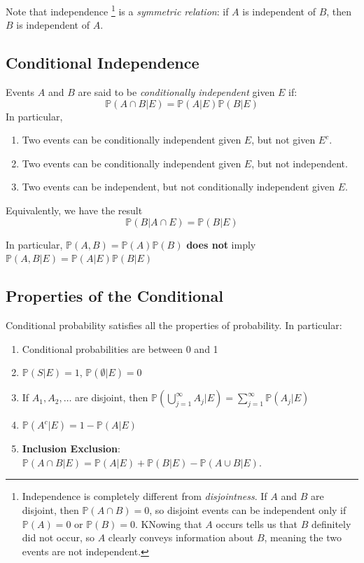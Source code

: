 \documentclass{article}
\begin{document}
Note that independence \footnote{Independence is completely different from \textit{disjointness}. If $A$ and $B$ are disjoint, then $ \mathbb{P}(A \cap B) = 0$, so disjoint events can be independent only if $ \mathbb{P}(A) = 0$ or $ \mathbb{P}(B) = 0$. KNowing that $A$ occurs tells us that $B$ definitely did not occur, so $A$ clearly conveys information about $B$, meaning the two events are not independent.} is a \textit{symmetric relation}: if $A$ is independent of $B$, then $B$ is independent of $A$.

\subsection{Conditional Independence}

\begin{definition}
    Events $A$ and $B$ are said to be \textit{conditionally independent} given $E$ if: \begin{equation}
        \mathbb{P}(A \cap B | E) = \mathbb{P} (A | E) \mathbb{P} (B | E)
    \end{equation} In particular, \begin{enumerate}
        \item Two events can be conditionally independent given $E$, but not given $E^{c}$.
        \item Two events can be conditionally independent given $E$, but not independent. 
        \item Two events can be independent, but not conditionally independent given $E$. 
    \end{enumerate}  
    \noindent Equivalently, we have the result \begin{equation}
        \mathbb{P}(B | A \cap E) = \mathbb{P}(B | E)
    \end{equation}
\end{definition} In particular, $ \mathbb{P}(A, B) = \mathbb{P}(A) \mathbb{P}(B)$ \textbf{does not} imply $ \mathbb{P}(A, B | E) = \mathbb{P} (A |E ) \mathbb{P}(B|E)$

\subsection{Properties of the Conditional}

Conditional probability satisfies all the properties of probability. In particular:

\begin{enumerate}
    \item Conditional probabilities are between 0 and 1
    \item $ \mathbb{P}(S | E) = 1$, $ \mathbb{P}(\emptyset | E) = 0$
    \item If $A_{1}, A_{2}, \dots$ are disjoint, then $ \mathbb{P}(\bigcup_{j=1}^{\infty} A_j | E) = \sum_{j=1}^{\infty} \mathbb{P}(A_j | E) $
    \item $ \mathbb{P}(A^{c}|E) = 1 - \mathbb{P}(A | E)$
    \item \textbf{Inclusion Exclusion}: $ \mathbb{P}(A \cap B | E) = \mathbb{P}(A | E) + \mathbb{P}(B|E) - \mathbb{P}(A \cup B | E )$.
\end{enumerate} 
\end{document}

